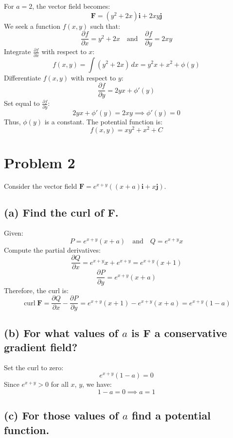 \documentclass[11pt]{article}
\begin{document}
For $a = 2$, the vector field becomes:
\[
\mathbf{F} = (y^2 + 2x)\mathbf{i} + 2 x y \mathbf{j}
\]
We seek a function $f(x, y)$ such that:
\[
\frac{\partial f}{\partial x} = y^2 + 2x \quad \text{and} \quad \frac{\partial f}{\partial y} = 2 x y
\]
Integrate $\frac{\partial f}{\partial x}$ with respect to $x$:
\[
f(x, y) = \int (y^2 + 2x) \, dx = y^2 x + x^2 + \phi(y)
\]
Differentiate $f(x, y)$ with respect to $y$:
\[
\frac{\partial f}{\partial y} = 2 y x + \phi'(y)
\]
Set equal to $\frac{\partial f}{\partial y}$:
\[
2 y x + \phi'(y) = 2 x y \implies \phi'(y) = 0
\]
Thus, $\phi(y)$ is a constant. The potential function is:
\[
f(x, y) = x y^2 + x^2 + C
\]

\newpage

\section{Problem 2}

Consider the vector field $\mathbf{F} = e^{x+y}\left( (x + a)\mathbf{i} + x \mathbf{j} \right)$.

\newpage

\subsection{(a) Find the curl of $\mathbf{F}$.}

Given:
\[
P = e^{x + y} (x + a) \quad \text{and} \quad Q = e^{x + y} x
\]
Compute the partial derivatives:
\[
\frac{\partial Q}{\partial x} = e^{x + y} x + e^{x + y} = e^{x + y} (x + 1)
\]
\[
\frac{\partial P}{\partial y} = e^{x + y} (x + a)
\]
Therefore, the curl is:
\[
\operatorname{curl} \mathbf{F} = \frac{\partial Q}{\partial x} - \frac{\partial P}{\partial y} = e^{x + y} (x + 1) - e^{x + y} (x + a) = e^{x + y} (1 - a)
\]

\newpage

\subsection{(b) For what values of $a$ is $\mathbf{F}$ a conservative gradient field?}

Set the curl to zero:
\[
e^{x + y} (1 - a) = 0
\]
Since $e^{x + y} > 0$ for all $x$, $y$, we have:
\[
1 - a = 0 \implies a = 1
\]

\newpage

\subsection{(c) For those values of $a$ find a potential function.}
\end{document}
